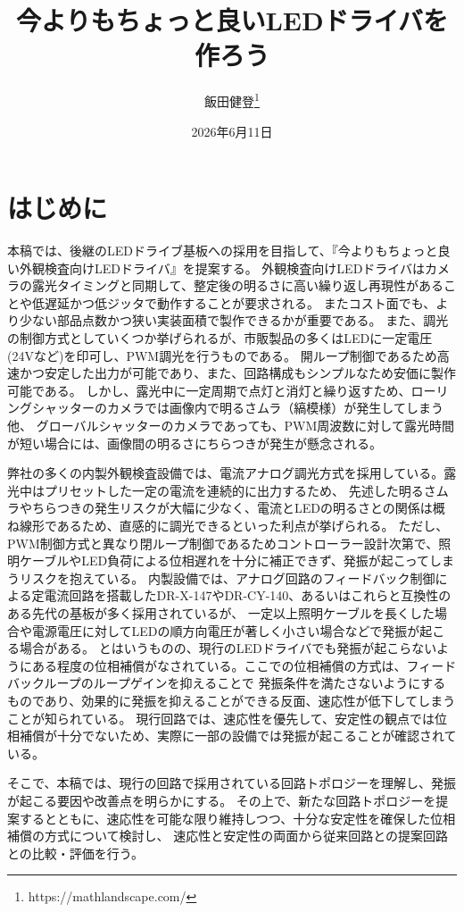 \documentclass{ltjsarticle}
\title{今よりもちょっと良いLEDドライバを作ろう}
\author{飯田健登\thanks{https://mathlandscape.com/}}
\date{2026年6月11日}
\begin{document}
\maketitle

\section{はじめに}
本稿では、後継のLEDドライブ基板への採用を目指して、『今よりもちょっと良い外観検査向けLEDドライバ』を提案する。
外観検査向けLEDドライバはカメラの露光タイミングと同期して、整定後の明るさに高い繰り返し再現性があることや低遅延かつ低ジッタで動作することが要求される。
またコスト面でも、より少ない部品点数かつ狭い実装面積で製作できるかが重要である。
また、調光の制御方式としていくつか挙げられるが、市販製品の多くはLEDに一定電圧(24Vなど)を印可し、PWM調光を行うものである。
開ループ制御であるため高速かつ安定した出力が可能であり、また、回路構成もシンプルなため安価に製作可能である。
しかし、露光中に一定周期で点灯と消灯と繰り返すため、ローリングシャッターのカメラでは画像内で明るさムラ（縞模様）が発生してしまう他、
グローバルシャッターのカメラであっても、PWM周波数に対して露光時間が短い場合には、画像間の明るさにちらつきが発生が懸念される。

弊社の多くの内製外観検査設備では、電流アナログ調光方式を採用している。露光中はプリセットした一定の電流を連続的に出力するため、
先述した明るさムラやちらつきの発生リスクが大幅に少なく、電流とLEDの明るさとの関係は概ね線形であるため、直感的に調光できるといった利点が挙げられる。
ただし、PWM制御方式と異なり閉ループ制御であるためコントローラー設計次第で、照明ケーブルやLED負荷による位相遅れを十分に補正できず、発振が起こってしまうリスクを抱えている。
内製設備では、アナログ回路のフィードバック制御による定電流回路を搭載したDR-X-147やDR-CY-140、あるいはこれらと互換性のある先代の基板が多く採用されているが、
一定以上照明ケーブルを長くした場合や電源電圧に対してLEDの順方向電圧が著しく小さい場合などで発振が起こる場合がある。
とはいうものの、現行のLEDドライバでも発振が起こらないようにある程度の位相補償がなされている。ここでの位相補償の方式は、フィードバックループのループゲインを抑えることで
発振条件を満たさないようにするものであり、効果的に発振を抑えることができる反面、速応性が低下してしまうことが知られている。
現行回路では、速応性を優先して、安定性の観点では位相補償が十分でないため、実際に一部の設備では発振が起こることが確認されている。

そこで、本稿では、現行の回路で採用されている回路トポロジーを理解し、発振が起こる要因や改善点を明らかにする。
その上で、新たな回路トポロジーを提案するとともに、速応性を可能な限り維持しつつ、十分な安定性を確保した位相補償の方式について検討し、
速応性と安定性の両面から従来回路との提案回路との比較・評価を行う。
\end{document}
